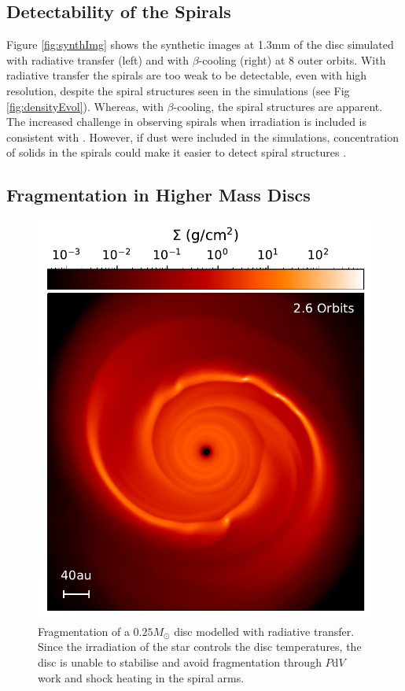\documentclass[usenatbib]{mnras}
\begin{document}
\subsection{Detectability of the Spirals}

Figure \ref{fig:synthImg} shows the synthetic images at 1.3mm of the disc simulated with radiative transfer (left) and with $\beta$-cooling (right) at 8 outer orbits. With radiative transfer the spirals are too weak to be detectable, even with high resolution, despite the spiral structures seen in the simulations (see Fig \ref{fig:densityEvol}). Whereas, with $\beta$-cooling, the spiral structures are apparent. The increased challenge in observing spirals when irradiation is included is consistent with \cite{2016Hall}. However, if dust were included in the simulations, concentration of solids in the spirals could make it easier to detect spiral structures \citep{2015bDipierro,2020Cadman}.

\subsection{Fragmentation in Higher Mass Discs}

\begin{figure}
    \centering
    \includegraphics[width=\linewidth]{Images/Md0p25_fragmented.pdf}
    \caption{Fragmentation of a $0.25M_\odot$ disc modelled with radiative transfer. Since the irradiation of the star controls the disc temperatures, the disc is unable to stabilise and avoid fragmentation through $P\mathrm{d}V$ work and shock heating in the spiral arms.
    }
    \label{fig:Md0p25}
\end{figure}
\end{document}
